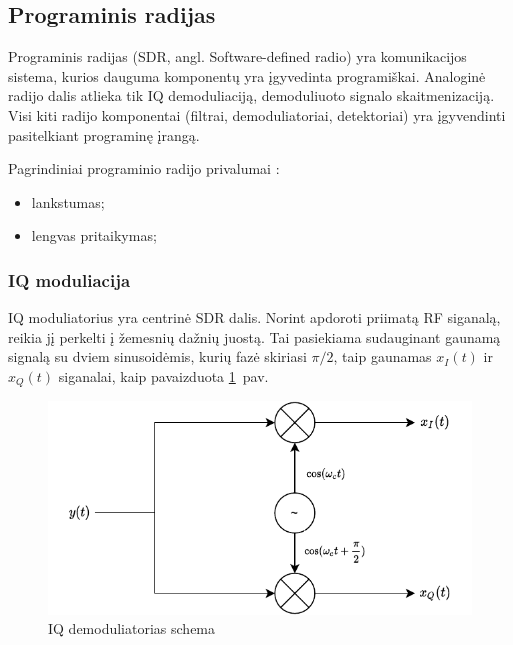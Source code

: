 \documentclass[main.tex]{subfiles}
\begin{document}
\subsection{Programinis radijas}

Programinis radijas (SDR, angl. Software-defined radio) yra komunikacijos sistema,
kurios dauguma komponentų yra įgyvedinta programiškai. Analoginė radijo dalis
atlieka tik IQ demoduliaciją, demoduliuoto signalo skaitmenizaciją.
Visi kiti radijo komponentai (filtrai, demoduliatoriai, detektoriai) yra įgyvendinti
pasitelkiant programinę įrangą.

Pagrindiniai programinio radijo privalumai \cite{Sadiku-2004}:
\begin{itemize}
    \item lankstumas;
    \item lengvas pritaikymas;
\end{itemize}

\subsubsection{IQ moduliacija}

IQ moduliatorius yra centrinė SDR dalis. Norint apdoroti priimatą RF siganalą, reikia
jį perkelti į žemesnių dažnių juostą. Tai pasiekiama sudauginant gaunamą signalą su dviem
sinusoidėmis, kurių fazė skiriasi $\pi/2$, taip gaunamas $x_I(t)$ ir $x_Q(t)$ siganalai,
kaip pavaizduota \ref{fig:iq_modulator}~pav.

\begin{figure}[h]
    \begin{centering}
    \includegraphics[scale=1.0]{drawings/iq_modulator}
    \par\end{centering}
    \protect\caption{\label{fig:iq_modulator}IQ demoduliatorias schema}
\end{figure}
\end{document}

